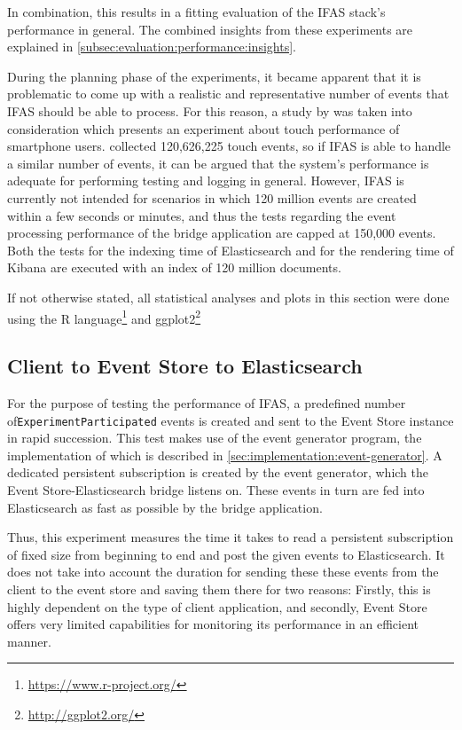 In combination, this results in a fitting evaluation of the \ac{IFAS} stack's performance in general.
The combined insights from these experiments are explained in \cref{subsec:evaluation:performance:insights}.

During the planning phase of the experiments, it became apparent that it is problematic to come up with a realistic and representative number of events that \ac{IFAS} should be able to process.
For this reason, a study by \citet{Henze2011} was taken into consideration which presents an experiment about touch performance of smartphone users.
\citeauthor{Henze2011} collected 120,626,225 touch events, so if \ac{IFAS} is able to handle a similar number of events, it can be argued that the system's performance is adequate for performing testing and logging in general.
However, \ac{IFAS} is currently not intended for scenarios in which 120 million events are created within a few seconds or minutes, and thus the tests regarding the event processing performance of the bridge application are capped at 150,000 events.
Both the tests for the indexing time of Elasticsearch and for the rendering time of Kibana are executed with an index of 120 million documents.

If not otherwise stated, all statistical analyses and plots in this section were done using the R language\footnote{\url{https://www.r-project.org/}} and ggplot2\footnote{\url{http://ggplot2.org/}}

\subsection{Client to Event Store to Elasticsearch}
\label{subsec:evaluation:performance:evt-es-bridge}

For the purpose of testing the performance of \ac{IFAS}, a predefined number of\linebreak \texttt{ExperimentParticipated} events is created and sent to the Event Store instance in rapid succession.
This test makes use of the event generator program, the implementation of which is described in \cref{sec:implementation:event-generator}.
A dedicated persistent subscription is created by the event generator, which the Event Store-Elasticsearch bridge listens on.
These events in turn are fed into Elasticsearch as fast as possible by the bridge application.

Thus, this experiment measures the time it takes to read a persistent subscription of fixed size from beginning to end and post the given events to Elasticsearch.
It does not take into account the duration for sending these these events from the client to the event store and saving them there for two reasons:
Firstly, this is highly dependent on the type of client application, and secondly, Event Store offers very limited capabilities for monitoring its performance in an efficient manner.

